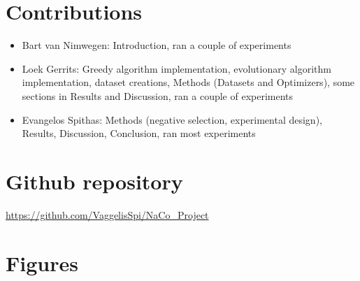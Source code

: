 \documentclass{article}
\begin{document}
\section{Contributions}

\begin{itemize}
    \item Bart van Nimwegen:
        Introduction, ran a couple of experiments

    \item Loek Gerrits:
        Greedy algorithm implementation, evolutionary algorithm implementation, dataset creations, Methods (Datasets and Optimizers), some sections in Results and Discussion, ran a couple of experiments
    
    \item Evangelos Spithas:
        Methods (negative selection, experimental design), Results, Discussion, Conclusion, ran most experiments

\end{itemize}


\section{Github repository}

\url{https://github.com/VaggelisSpi/NaCo_Project}

\printbibliography

\appendix
\section{Figures}
\end{document}
